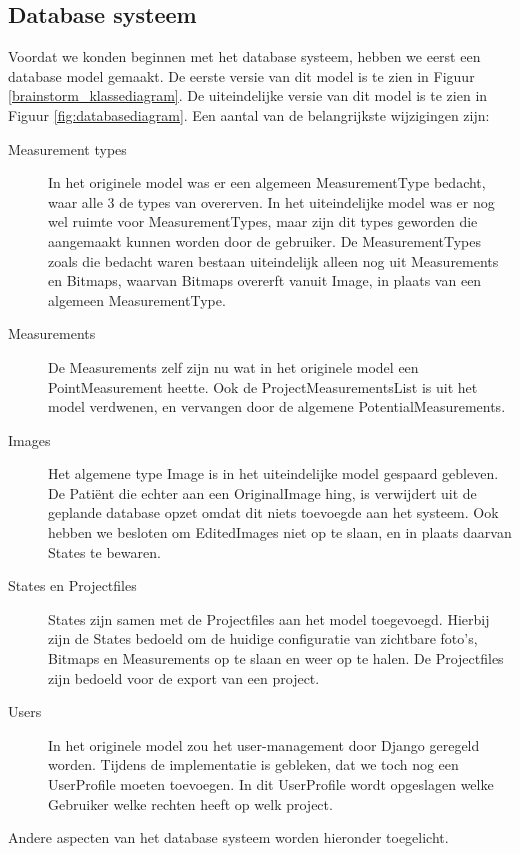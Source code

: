 \subsection{Database systeem}
\label{implementatie_database_systeem}
Voordat we konden beginnen met het database systeem, hebben we eerst een database model gemaakt. De eerste versie van dit model is te zien in Figuur \ref{brainstorm_klassediagram}.
De uiteindelijke versie van dit model is te zien in Figuur \ref{fig:databasediagram}.
Een aantal van de belangrijkste wijzigingen zijn:
\begin{description}
  \item[Measurement types] In het originele model was er een algemeen MeasurementType bedacht, waar alle 3 de types van overerven. 
  In het uiteindelijke model was er nog wel ruimte voor MeasurementTypes, maar zijn dit types geworden die aangemaakt kunnen worden door de gebruiker.
  De MeasurementTypes zoals die bedacht waren bestaan uiteindelijk alleen nog uit Measurements en Bitmaps, waarvan Bitmaps overerft vanuit Image, in plaats van een algemeen MeasurementType.
  \item[Measurements] De Measurements zelf zijn nu wat in het originele model een PointMeasurement heette.
  Ook de ProjectMeasurementsList is uit het model verdwenen, en vervangen door de algemene PotentialMeasurements.
  \item[Images] Het algemene type Image is in het uiteindelijke model gespaard gebleven.
  De Pati\"{e}nt die echter aan een OriginalImage hing, is verwijdert uit de geplande database opzet omdat dit niets toevoegde aan het systeem.
  Ook hebben we besloten om EditedImages niet op te slaan, en in plaats daarvan States te bewaren.
  \item[States en Projectfiles] States zijn samen met de Projectfiles aan het model toegevoegd.
  Hierbij zijn de States bedoeld om de huidige configuratie van zichtbare foto's, Bitmaps en Measurements op te slaan en weer op te halen.
  De Projectfiles zijn bedoeld voor de export van een project.
  \item[Users] In het originele model zou het user-management door Django geregeld worden.
  Tijdens de implementatie is gebleken, dat we toch nog een UserProfile moeten toevoegen.
  In dit UserProfile wordt opgeslagen welke Gebruiker welke rechten heeft op welk project.
\end{description}
Andere aspecten van het database systeem worden hieronder toegelicht.

